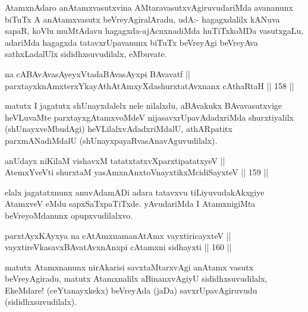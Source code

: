 \begin{artha}
AtamxnAdaro anAtamxvasutxvina AMtaravasutxvAgiruvudariMda avananunx
biTuTx A anAtamxvasutx beVreyAgiralAradu,  udA:- hagagxdalilx kANuva
sapaR, koVlu muMtAdavu hagagxda-ajAcnxnadiMda huTiTxkoMDa vasutxgaLu,
adariMda hagagxda tatavxrUpavanunx biTuTx beVreyAgi beVreyAva
sathxLadalUlx sididhxsuvudilalx, eMbuvate.
\end{artha}


\begin{shl}
na cABAvAvasAyeyxVtadaBAvasAyxpi BAvavatf || \\
parxtayxknAmxterxYkayAthAtAmxyXdashurxtatAvxnanx cAthaRtaH \hfill || 158 ||  
\end{shl}

\begin{artha}
matutx I jagatutx shUnayxdalelx nele nilalxdu, aBAvakukx
BAvavasutxvige heVLuvaMte parxtayxgAtamxvoMdeV nijasavxrUpavAdadxriMda
shurxtiyalilx (shUnayxveMbudAgi) heVLilalxvAdadxriMdalU, athARpatitx
parxmANadiMdalU (shUnayxpayaRvasAnavAguvudilalx).
\end{artha}

\begin{shl}
anUdayx niKilaM vishavxM tatatxtatxvXparxtipatatxyeV || \\
AtemxYveVti shurxtaM yasAmxnAnxtoV\s nayxtikxMcidiSayxteV \hfill || 159 ||  
\end{shl}

\begin{artha}
elalx jagatatxnunx anuvAdamADi adara tatavxvu tiLiyuvudakAkxgiye
AtamxveV eMdu sapxSaTxpaTiTxde. yAvudariMda I AtamxnigiMta
beVreyoMdanunx opupxvudilalxvo.
\end{artha}

\begin{shl}
parxtAyxKAyxya na cA\s \s tAmxnamanAtAmx vayxtiricayxteV || \\
vayxtireVkasavxBAvatAvxnAnxpi cA\s \s tamxni sidhayxti \hfill || 160 ||  
\end{shl}

\begin{artha}
matutx Atamxnanunx nirAkarisi savxtaMtarxvAgi anAtamx vasutx
beVreyAgiradu, matutx Atamxnalilx aBinanxvAgiyU sididhxsuvudilalx,
EkeMdare! (ceYtanayxkekx) beVreyAda (jaDa) savxrUpavAgiruvudu (sididhxsuvudilalx).
\end{artha}

